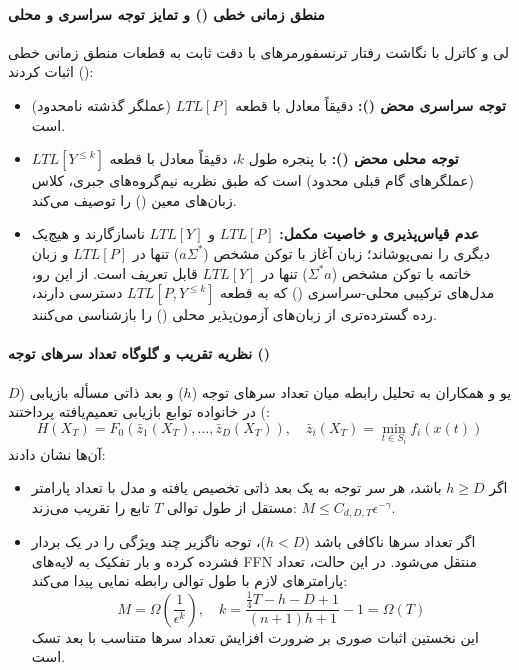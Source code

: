 \paragraph*{منطق زمانی خطی () و تمایز توجه سراسری و محلی}
لی و کاترل \cite{li2026characterizing} با نگاشت رفتار ترنسفورمرهای با دقت ثابت به قطعات منطق زمانی خطی () اثبات کردند:
\begin{itemize}
    \item \textbf{توجه سراسری محض ():} دقیقاً معادل با قطعه $LTL[P]$ (عملگر گذشته نامحدود) است.
    \item \textbf{توجه محلی محض ():} با پنجره طول $k$، دقیقاً معادل با قطعه $LTL[Y^{\le k}]$ (عملگرهای گام قبلی محدود) است که طبق نظریه نیم‌گروه‌های جبری، کلاس زبان‌های معین () را توصیف می‌کند.
    \item \textbf{عدم قیاس‌پذیری و خاصیت مکمل:} $LTL[P]$ و $LTL[Y]$ ناسازگارند و هیچ‌یک دیگری را نمی‌پوشاند؛ زبان آغاز با توکن مشخص ($a\Sigma^*$) تنها در $LTL[P]$ و زبان خاتمه با توکن مشخص ($\Sigma^* a$) تنها در $LTL[Y]$ قابل تعریف است. از این رو، مدل‌های ترکیبی محلی-سراسری () که به قطعه $LTL[P, Y^{\le k}]$ دسترسی دارند، رده گسترده‌تری از زبان‌های آزمون‌پذیر محلی () را بازشناسی می‌کنند.
\end{itemize}

\paragraph*{نظریه تقریب و گلوگاه تعداد سرهای توجه ()}
یو و همکاران \cite{yu2026effect} به تحلیل رابطه میان تعداد سرهای توجه ($h$) و بعد ذاتی مسأله بازیابی ($D$) در خانواده توابع بازیابی تعمیم‌یافته پرداختند:
\begin{equation}
    H(X_T) = F_0(\bar{z}_1(X_T), \dots, \bar{z}_D(X_T)), \quad \bar{z}_i(X_T) = \min_{t \in S_i} f_i(x(t))
\end{equation}
آن‌ها نشان دادند:
\begin{itemize}
    \item اگر $h \ge D$ باشد، هر سر توجه به یک بعد ذاتی تخصیص یافته و مدل با تعداد پارامتر مستقل از طول توالی $T$ تابع را تقریب می‌زند: $M \le C_{d,D,T} \epsilon^{-\gamma}$.
    \item اگر تعداد سرها ناکافی باشد ($h < D$)، توجه ناگزیر چند ویژگی را در یک بردار فشرده کرده و بار تفکیک به لایه‌های FFN منتقل می‌شود. در این حالت، تعداد پارامترهای لازم با طول توالی رابطه نمایی پیدا می‌کند:
    \begin{equation}
        M = \Omega\left(\frac{1}{\epsilon^k}\right), \quad k = \frac{\frac{1}{4}T - h - D + 1}{(n+1)h + 1} - 1 = \Omega(T)
    \end{equation}
    این نخستین اثبات صوری بر ضرورت افزایش تعداد سرها متناسب با بعد تسک است.
\end{itemize}


